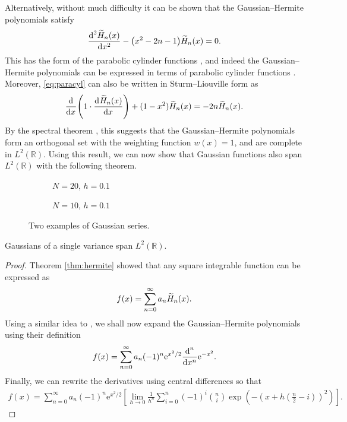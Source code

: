 Alternatively, without much difficulty it can be shown that the Gaussian--Hermite polynomials satisfy
\begin{align}
\label{eq:paracyl}
\diff[2]{\Her{n}{x}}{x} - \left( x^2 - 2n - 1 \right) \Her{n}{x} = 0.
\end{align}
This has the form of the parabolic cylinder functions \cite{miller}, and indeed the Gaussian--Hermite polynomials can be expressed in terms of parabolic cylinder functions \cite{hochstrasser, miller}. Moreover, \ref{eq:paracyl} can also be written in Sturm--Liouville form as
\begin{align*}
\diff{}{x} \left( 1 \cdot \diff{\Her{n}{x}}{x} \right) + (1 - x^2) \Her{n}{x} = -2n \Her{n}{x}.
\end{align*}
By the spectral theorem \cite{griffel, higson, kreyszig}, this suggests that the Gaussian--Hermite polynomials form an orthogonal set with the weighting function $w(x) = 1$, and are complete in $L^2(\mathbb{R})$. Using this result, we can now show that Gaussian functions also span $L^2(\mathbb{R})$ with the following theorem. \\

\begin{figure}[tbp]
\begin{subfigure}{0.5\textwidth}

\caption{$N = 20$, $h = 0.1$}
\end{subfigure}
\begin{subfigure}{0.5\textwidth}

\caption{$N = 10$, $h = 0.1$}
\end{subfigure}
\caption{Two examples of Gaussian series.}
\label{fig:gs}
\end{figure}

\begin{theorem}
\label{thm:gaussian}
Gaussians of a single variance span $L^2(\mathbb{R})$.
\end{theorem}
\begin{proof}
Theorem \ref{thm:hermite} showed that any square integrable function can be expressed as
\begin{align*}
f(x) = \sum_{n = 0}^\infty a_n \Her{n}{x}.
\end{align*}
Using a similar idea to \cite{calcaterra2, calcaterra}, we shall now expand the Gaussian--Hermite polynomials using their definition
\begin{align*}
f(x) = \sum_{n = 0}^\infty a_n (-1)^n \textrm{e}^{x^2/2} \diff[n]{}{x} \textrm{e}^{-x^2}.
\end{align*}
Finally, we can rewrite the derivatives using central differences \cite{zwillinger} so that
\begin{align}
f(x) = \sum_{n = 0}^\infty a_n (-1)^n \textrm{e}^{x^2/2} \left[ \lim_{h \rightarrow 0} \frac{1}{h^n} \sum_{i = 0}^n (-1)^i \binom{n}{i} \exp\left( -\left( x + h\left( \frac{n}{2} - i \right) \right)^2 \right) \right].
\label{eq:gs}
\end{align}
\end{proof}

